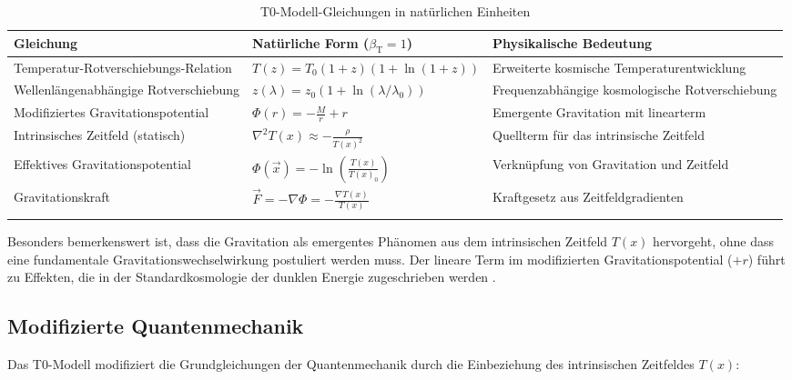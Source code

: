 \documentclass[12pt,a4paper]{article}
\newcommand{\Tfield}{T(x)}
\newcommand{\betaT}{\beta_{\text{T}}}
\begin{document}
	\begin{table}[ht]
		\centering
		\begin{adjustbox}{scale=0.70}
			\begin{tabular}{lll}
				\hline
				\textbf{Gleichung} & \textbf{Natürliche Form ($\betaT = 1$)} & \textbf{Physikalische Bedeutung} \\
				\hline
				Temperatur-Rotverschiebungs-Relation & $T(z) = T_0(1+z)(1+\ln(1+z))$ & Erweiterte kosmische Temperaturentwicklung \\
				Wellenlängenabhängige Rotverschiebung & $z(\lambda) = z_0(1+\ln(\lambda/\lambda_0))$ & Frequenzabhängige kosmologische Rotverschiebung \\
				Modifiziertes Gravitationspotential & $\Phi(r) = -\frac{M}{r} + r$ & Emergente Gravitation mit linearterm \\
				Intrinsisches Zeitfeld (statisch) & $\nabla^2\Tfield \approx -\frac{\rho}{\Tfield^2}$ & Quellterm für das intrinsische Zeitfeld \\
				Effektives Gravitationspotential & $\Phi(\vec{x}) = -\ln\left(\frac{\Tfield}{\Tfield_0}\right)$ & Verknüpfung von Gravitation und Zeitfeld \\
				Gravitationskraft & $\vec{F} = -\nabla\Phi = -\frac{\nabla\Tfield}{\Tfield}$ & Kraftgesetz aus Zeitfeldgradienten \\
				\hline
			\multicolumn{2}{c}{} \\
				\hline
			\end{tabular}
		\end{adjustbox}
		\caption{T0-Modell-Gleichungen in natürlichen Einheiten }
		\label{tab:t0_equations}
	\end{table}
	
	Besonders bemerkenswert ist, dass die Gravitation als emergentes Phänomen aus dem intrinsischen Zeitfeld $\Tfield$ hervorgeht, ohne dass eine fundamentale Gravitationswechselwirkung postuliert werden muss. Der lineare Term im modifizierten Gravitationspotential ($+r$) führt zu Effekten, die in der Standardkosmologie der dunklen Energie zugeschrieben werden \cite{pascher_emergente_2025}.
	
	\subsection{Modifizierte Quantenmechanik}
	
	Das T0-Modell modifiziert die Grundgleichungen der Quantenmechanik durch die Einbeziehung des intrinsischen Zeitfeldes $\Tfield$:
	
\end{document}
